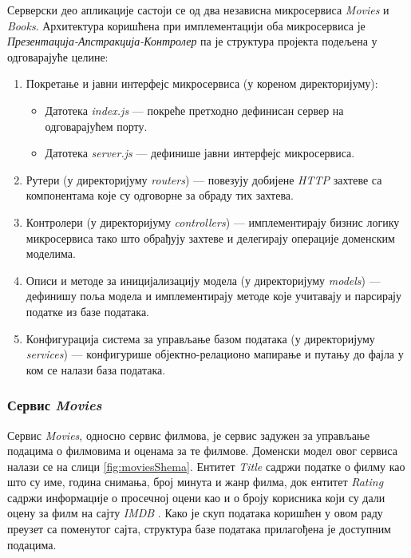\documentclass[12pt,oneside]{memoir}
\begin{document}
Серверски део апликације састоји се од два независна микросервиса \textit{Movies} и \textit{Books}. Архитектура коришћена при имплементацији оба микросервиса је \textit{Презентација-Апстракција-Контролер} па је структура пројекта подељена у одговарајуће целине:
\begin{enumerate}
\item Покретање и јавни интерфејс микросервиса (у кореном директоријуму):
\begin{itemize}
\item Датотека \textit{index.js} --- покреће претходно дефинисан сервер на одговарајућем порту.
\item Датотека \textit{server.js} --- дефинише јавни интерфејс микросервиса.
\end{itemize}
\item Рутери (у директоријуму \textit{routers}) --- повезују добијене \textit{HTTP} захтеве са компонентама које су одговорне за обраду тих захтева.
\item Контролери (у директоријуму \textit{controllers}) --- имплементирају бизнис логику микросервиса тако што обрађују захтеве и делегирају операције доменским моделима.
\item Описи и методе за иницијализацију модела (у директоријуму \textit{models}) ---  дефинишу поља модела и имплементирају методе које учитавају и парсирају податке из базе података.
\item Конфигурација  система за управљање базом података (у директоријуму \textit{services}) --- конфигурише објектно-релационо мапирање и путању до фајла у ком се налази база података.
\end{enumerate}


\subsubsection{Сервис \textit{Movies}}

Сервис \textit{Movies}, односно сервис филмова, је сервис задужен за управљање подацима о филмовима и оценама за те филмове. Доменски модел овог сервиса налази се на слици \ref{fig:moviesShema}. Ентитет \textit{Title} садржи податке о филму као што су име, година снимања, број минута и жанр филма, док ентитет \textit{Rating} садржи информације о просечној оцени као и о броју корисника који су дали оцену за филм на сајту \textit{IMDB} \cite{imdb}. Како је скуп података коришћен у овом раду преузет са поменутог сајта, структура базе података прилагођена је доступним подацима.
\end{document}
